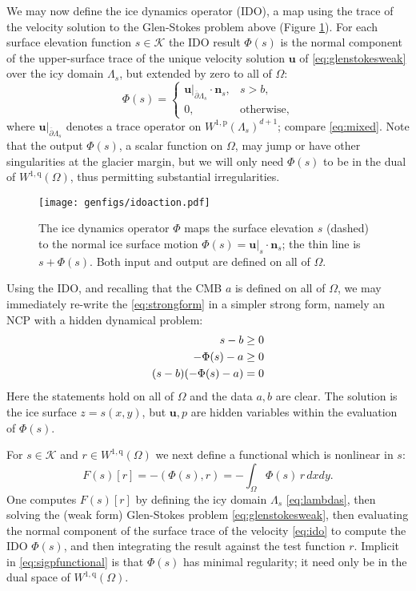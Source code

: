 \documentclass[letterpaper,final,12pt,reqno]{amsart}
\theoremstyle{claim}
\newcommand{\bn}{\mathbf{n}}
\newcommand{\bu}{\mathbf{u}}
\newcommand{\ip}[2]{\left(#1,#2\right)}
\newcommand{\pp}{{\text{p}}}
\newcommand{\qq}{{\text{q}}}
\numberwithin{equation}{section}
\numberwithin{figure}{section}
\numberwithin{table}{section}
\numberwithin{theorem}{section}
\begin{document}
We may now define the ice dynamics operator (IDO), a map using the trace of the velocity solution to the Glen-Stokes problem above (Figure \ref{fig:idoaction}).  For each surface elevation function $s \in \mathcal{K}$ the IDO result $\Phi(s)$ is the normal component of the upper-surface trace of the unique velocity solution $\bu$ of \eqref{eq:glenstokesweak} over the icy domain $\Lambda_s$, but extended by zero to all of $\Omega$:
\begin{equation}
\Phi(s) = \begin{cases} \bu|_{\overline{\partial} \Lambda_s} \cdot \bn_s, & s > b, \\
                        0, & \text{otherwise}, \end{cases} \label{eq:ido}
\end{equation}
where $\bu|_{\overline{\partial} \Lambda_s}$ denotes a trace operator on $W^{1,\pp}(\Lambda_s)^{d+1}$; compare \eqref{eq:mixed}.  Note that the output $\Phi(s)$, a scalar function on $\Omega$, may jump or have other singularities at the glacier margin, but we will only need $\Phi(s)$ to be in the dual of $W^{1,\qq}(\Omega)$, thus permitting substantial irregularities.

\begin{figure}[t]
\begin{center}
\texttt{[image: genfigs/idoaction.pdf]}
\end{center}
\caption{The ice dynamics operator $\Phi$ maps the surface elevation $s$ (dashed) to the normal ice surface motion $\Phi(s)=\bu|_s \cdot \bn_s$; the thin line is $s+\Phi(s)$.  Both input and output are defined on all of $\Omega$.}
\label{fig:idoaction}
\end{figure}

Using the IDO, and recalling that the CMB $a$ is defined on all of $\Omega$, we may immediately re-write the \eqref{eq:strongform} in a simpler strong form, namely an NCP with a hidden dynamical problem:
\begin{align}
s - b &\ge 0  \label{eq:idostrongform} \\
- \Phi(s) - a &\ge 0 \notag \\
(s - b) (- \Phi(s) - a) &= 0 \notag
\end{align}
Here the statements hold on all of $\Omega$ and the data $a,b$ are clear.  The solution is the ice surface $z=s(x,y)$, but $\bu,p$ are hidden variables within the evaluation of $\Phi(s)$.

For $s \in \mathcal{K}$ and $r \in W^{1,\qq}(\Omega)$ we next define a functional which is nonlinear in $s$:
\begin{equation}
F(s)[r] = - \ip{\Phi(s)}{r} = - \int_\Omega \Phi(s)\, r \,dx dy. \label{eq:sigpfunctional}
\end{equation}
One computes $F(s)[r]$ by defining the icy domain $\Lambda_s$ \eqref{eq:lambdas}, then solving the (weak form) Glen-Stokes problem \eqref{eq:glenstokesweak}, then evaluating the normal component of the surface trace of the velocity \eqref{eq:ido} to compute the IDO $\Phi(s)$, and then integrating the result against the test function $r$.  Implicit in \eqref{eq:sigpfunctional} is that $\Phi(s)$ has minimal regularity; it need only be in the dual space of $W^{1,\qq}(\Omega)$.
\end{document}
